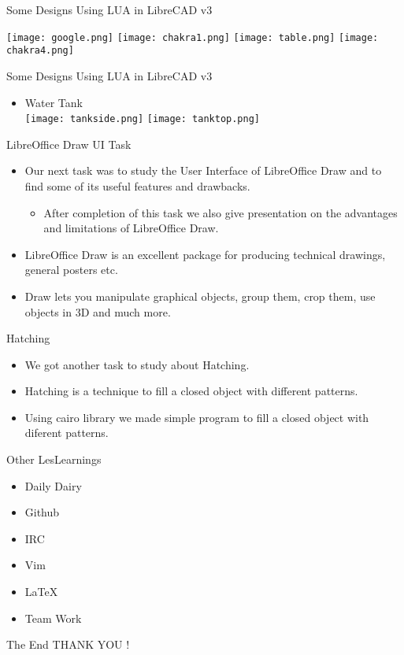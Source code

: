\begin{frame}[t,fragile]{Some Designs Using LUA in LibreCAD v3}

\texttt{[image: google.png]}
\hspace*{1\baselineskip}
\texttt{[image: chakra1.png]}
\vspace*{1\baselineskip}
\texttt{[image: table.png]}
\hspace*{1\baselineskip}
\texttt{[image: chakra4.png]}
\end{frame}

\begin{frame}[t,fragile]{Some Designs Using LUA in LibreCAD v3}
\begin{itemize}\item Water Tank\\

\texttt{[image: tankside.png]}
\hspace*{1\baselineskip}
\texttt{[image: tanktop.png]}
\end{itemize}
\end{frame}

\begin{frame}[t,fragile]{LibreOffice Draw UI Task}
\begin{itemize}
\item<1-> Our next task was to study the User Interface of LibreOffice Draw and to find some of its useful features and drawbacks.
\begin{itemize}\item<2-> After completion of this task we also give presentation on the advantages and limitations of LibreOffice Draw.
\end{itemize}
\item<3-> LibreOffice Draw is an excellent package for producing technical drawings, general posters etc.
\item<4-> Draw lets you manipulate graphical objects, group them, crop them, use objects in 3D and much more.

\end{itemize}
\end{frame}


\begin{frame}[t,fragile]{Hatching}
\begin{itemize}
\item<1-> We got another task to study about Hatching.
\item<2-> Hatching is a technique to fill a closed object with different patterns. 
\item<3-> Using cairo library we made simple program to fill a closed object with diferent patterns.
  \end{itemize}
\end{frame}
\watermarkon

\begin{frame}[t,fragile]{Other LesLearnings}
\begin{itemize}
\item<1-> Daily Dairy
\item<2-> Github
\item<3-> IRC
\item<4-> Vim
\item<5-> \LaTeX
\item<6-> Team Work
\end{itemize}
\end{frame}

\begin{frame}[t,fragile]{The End}
 THANK YOU !
\end{frame}
